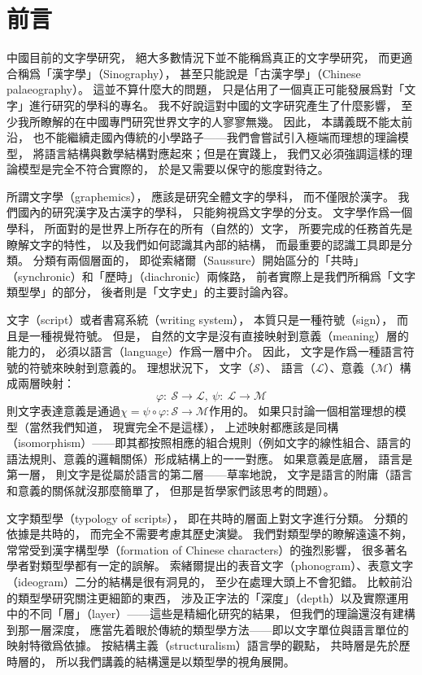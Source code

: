 \chapter*{前言}

中國目前的文字學研究，
絕大多數情況下並不能稱爲真正的文字學研究，
而更適合稱爲「漢字學」（Sinography），
甚至只能說是「古漢字學」（Chinese palaeography）。
這並不算什麼大的問題，
只是佔用了一個真正可能發展爲對「文字」進行研究的學科的專名。
我不好說這對中國的文字研究產生了什麼影響，
至少我所瞭解的在中國專門研究世界文字的人寥寥無幾。
因此，
本講義既不能太前沿，
也不能繼續走國內傳統的小學路子——我們會嘗試引入極端而理想的理論模型，
將語言結構與數學結構對應起來；但是在實踐上，
我們又必須強調這樣的理論模型是完全不符合實際的，
於是又需要以保守的態度對待之。


所謂文字學（graphemics），
應該是研究全體文字的學科，
而不僅限於漢字。
我們國內的研究漢字及古漢字的學科，
只能夠視爲文字學的分支。
文字學作爲一個學科，
所面對的是世界上所存在的所有（自然的）文字，
所要完成的任務首先是瞭解文字的特性，
以及我們如何認識其內部的結構，
而最重要的認識工具即是分類。
分類有兩個層面的，
即從索緒爾（Saussure）開始區分的「共時」（synchronic）和「歷時」（diachronic）兩條路，
前者實際上是我們所稱爲「文字類型學」的部分，
後者則是「文字史」的主要討論內容。


文字（script）或者書寫系統（writing system），
本質只是一種符號（sign），
而且是一種視覺符號。
但是，
自然的文字是沒有直接映射到意義（meaning）層的能力的，
必須以語言（language）作爲一層中介。
因此，
文字是作爲一種語言符號的符號來映射到意義的。
理想狀況下，
文字（$\mathcal S$）、 語言（$\mathcal L$）、意義（$\mathcal M$）構成兩層映射：
\[\varphi:\ \mathcal S\rightarrow \mathcal L,\ \psi:\ \mathcal L\rightarrow \mathcal M\]則文字表達意義是通過$\chi=\psi\circ\varphi:\mathcal S\rightarrow \mathcal M$作用的。
如果只討論一個相當理想的模型（當然我們知道，
現實完全不是這樣），
上述映射都應該是同構（isomorphism）——即其都按照相應的組合規則（例如文字的線性組合、語言的語法規則、意義的邏輯關係）形成結構上的一一對應。
如果意義是底層，
語言是第一層，
則文字是從屬於語言的第二層——草率地說，
文字是語言的附庸（語言和意義的關係就沒那麼簡單了，
但那是哲學家們該思考的問題）。


文字類型學（typology of scripts），
即在共時的層面上對文字進行分類。
分類的依據是共時的，
而完全不需要考慮其歷史演變。
我們對類型學的瞭解遠遠不夠，
常常受到漢字構型學（formation of Chinese characters）的強烈影響，
很多著名學者對類型學都有一定的誤解。
索緒爾提出的表音文字（phonogram）、表意文字（ideogram）二分的結構是很有洞見的，
至少在處理大頭上不會犯錯。
比較前沿的類型學研究關注更細節的東西，
涉及正字法的「深度」（depth）以及實際運用中的不同「層」（layer）——這些是精細化研究的結果，
但我們的理論還沒有建構到那一層深度，
應當先着眼於傳統的類型學方法——即以文字單位與語言單位的映射特徵爲依據。
按結構主義（structuralism）語言學的觀點，
共時層是先於歷時層的，
所以我們講義的結構還是以類型學的視角展開。


